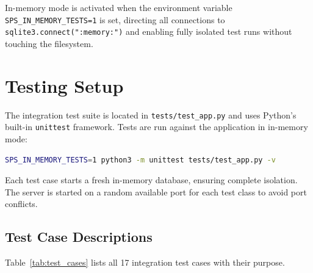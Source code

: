 In-memory mode is activated when the environment variable \texttt{SPS\_IN\_MEMORY\_TESTS=1} is set, directing all connections to \texttt{sqlite3.connect(":memory:")} and enabling fully isolated test runs without touching the filesystem.

\section{Testing Setup}
\label{sec:impl_testing}

The integration test suite is located in \texttt{tests/test\_app.py} and uses Python's built-in \texttt{unittest} framework. Tests are run against the application in in-memory mode:

\begin{lstlisting}[language=bash,caption={Running the test suite},label={lst:test_run}]
SPS_IN_MEMORY_TESTS=1 python3 -m unittest tests/test_app.py -v
\end{lstlisting}

Each test case starts a fresh in-memory database, ensuring complete isolation. The server is started on a random available port for each test class to avoid port conflicts.

\subsection{Test Case Descriptions}
\label{sec:impl_test_cases}

Table~\ref{tab:test_cases} lists all 17 integration test cases with their purpose.


